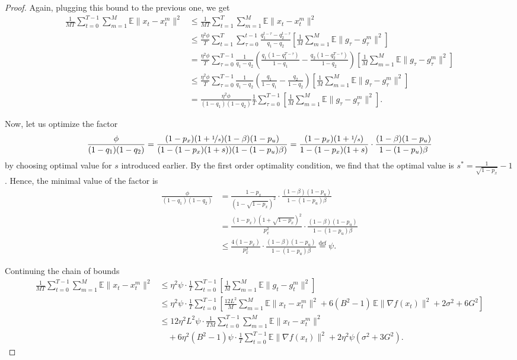 \begin{proof}
Again, plugging this bound to the previous one, we get
\begin{align*}
\frac{1}{MT}\sum_{t=0}^{T-1}\sum_{m=1}^{M}\mathbb{E}\|x_t - x_t^m\|^2
&\leq \frac{1}{MT}\sum_{t=1}^{T}\sum_{m=1}^{M}\mathbb{E}\|x_t - x_t^m\|^2 \\
&\leq \frac{\eta^2\phi}{T}\sum_{t=1}^{T}\sum_{\tau=0}^{t-1}\frac{q_1^{t-\tau}-q_2^{t-\tau}}{q_1-q_2}\left[\frac{1}{M}\sum_{m=1}^{M}\mathbb{E}\|g_\tau - g_\tau^m\|^2\right] \\
&= \frac{\eta^2\phi}{T}\sum_{\tau=0}^{T-1}\frac{1}{q_1-q_2}\left(\frac{q_1(1-q_1^{T-\tau})}{1-q_1} - \frac{q_2(1-q_2^{T-\tau})}{1-q_2}\right)\left[\frac{1}{M}\sum_{m=1}^{M}\mathbb{E}\|g_\tau - g_\tau^m\|^2\right] \\
&\leq \frac{\eta^2\phi}{T}\sum_{\tau=0}^{T-1}\frac{1}{q_1-q_2}\left(\frac{q_1}{1-q_1} - \frac{q_2}{1-q_2}\right)\left[\frac{1}{M}\sum_{m=1}^{M}\mathbb{E}\|g_\tau - g_\tau^m\|^2\right] \\
&= \frac{\eta^2\phi}{(1-q_1)(1-q_2)}\frac{1}{T}\sum_{\tau=0}^{T-1}\left[\frac{1}{M}\sum_{m=1}^{M}\mathbb{E}\|g_\tau - g_\tau^m\|^2\right].
\end{align*}

Now, let us optimize the factor
\[
\frac{\phi}{(1-q_1)(1-q_2)}
= \frac{(1-p_x)(1+\nicefrac{1}{s})(1-\beta)(1-p_u)}{(1-(1-p_x)(1+s))(1-(1-p_u)\beta)}
= \frac{(1-p_x)(1+\nicefrac{1}{s})}{1-(1-p_x)(1+s)}\cdot\frac{(1-\beta)(1-p_u)}{1-(1-p_u)\beta}
\]
by choosing optimal value for $s$ introduced earlier. By the first order optimality condition, we find that the optimal value is $s^* = \frac{1}{\sqrt{1-p_x}} - 1$. Hence, the minimal value of the factor is
\begin{align*}
\frac{\phi}{(1-q_1)(1-q_2)}
&= \frac{1-p_x}{(1-\sqrt{1-p_x})^2}\cdot\frac{(1-\beta)(1-p_u)}{1-(1-p_u)\beta} \\
&= \frac{(1-p_x)(1+\sqrt{1-p_x})^2}{p_x^2}\cdot\frac{(1-\beta)(1-p_u)}{1-(1-p_u)\beta} \\
&\leq \frac{4(1-p_x)}{p_x^2}\cdot\frac{(1-\beta)(1-p_u)}{1-(1-p_u)\beta}
\stackrel{\text{def}}{=} \psi.
\end{align*}

Continuing the chain of bounds
\begin{align*}
\frac{1}{MT}\sum_{t=0}^{T-1}\sum_{m=1}^{M}\mathbb{E}\|x_t - x_t^m\|^2
&\leq \eta^2\psi\cdot\frac{1}{T}\sum_{t=0}^{T-1}\left[\frac{1}{M}\sum_{m=1}^{M}\mathbb{E}\|g_t - g_t^m\|^2\right] \\
&\leq \eta^2\psi\cdot\frac{1}{T}\sum_{t=0}^{T-1}\left[\frac{12L^2}{M}\sum_{m=1}^{M}\mathbb{E}\|x_t - x_t^m\|^2 + 6(B^2-1)\,\mathbb{E}\|\nabla f(x_t)\|^2 + 2\sigma^2 + 6G^2\right] \\
&\leq 12\eta^2 L^2\psi\cdot\frac{1}{TM}\sum_{t=0}^{T-1}\sum_{m=1}^{M}\mathbb{E}\|x_t - x_t^m\|^2 \\
&\quad + 6\eta^2(B^2-1)\psi\cdot\frac{1}{T}\sum_{t=0}^{T-1}\mathbb{E}\|\nabla f(x_t)\|^2 + 2\eta^2\psi(\sigma^2 + 3G^2).
\end{align*}


\end{proof}
